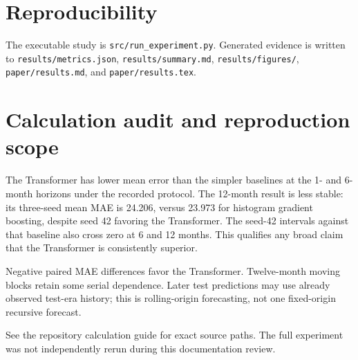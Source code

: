 \documentclass[11pt]{article}
\begin{document}
\section{Reproducibility}
The executable study is \texttt{src/run\_experiment.py}. Generated evidence is written to \texttt{results/metrics.json}, \texttt{results/summary.md}, \texttt{results/figures/}, \texttt{paper/results.md}, and \texttt{paper/results.tex}.



\section{Calculation audit and reproduction scope}
The Transformer has lower mean error than the simpler baselines at the 1- and 6-month horizons under the recorded protocol. The 12-month result is less stable: its three-seed mean MAE is 24.206, versus 23.973 for histogram gradient boosting, despite seed 42 favoring the Transformer. The seed-42 intervals against that baseline also cross zero at 6 and 12 months. This qualifies any broad claim that the Transformer is consistently superior.

Negative paired MAE differences favor the Transformer. Twelve-month moving blocks retain some serial dependence. Later test predictions may use already observed test-era history; this is rolling-origin forecasting, not one fixed-origin recursive forecast.

See the repository calculation guide for exact source paths. The full experiment was not independently rerun during this documentation review.
\end{document}
